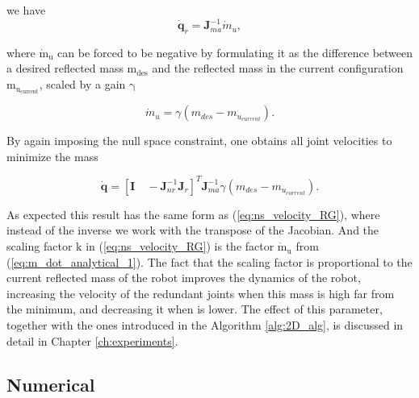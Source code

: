 we have 
\begin{equation}
\mathbf{\dot{q}}_r = \mathbf{J}_{ma}^{-1} {\dot{m}_u},
\label{eq:qr_jma}
\end{equation}

where ${\mathrm{\dot{m}_u}}$ can be forced  to be negative by formulating it as the difference between a desired reflected mass $\mathrm{m_{des}}$ and the reflected mass in the current configuration $\mathrm{m_{u_{current}}}$, scaled by a gain $\mathrm{\gamma}$


\begin{equation}
{\dot{m}_u} =  \gamma (m_{des} - m_{u_{current}}).
\label{eq:m_dot_analytical_1}
\end{equation}

By again imposing the null space constraint, one obtains all joint velocities to minimize the mass

\begin{equation}
\mathbf{\dot{q}} = [\mathbf{I} \quad  -\mathbf{J}_{nr}^{-1} \mathbf{J}_r]^T   \mathbf{J}_{ma}^{-1} \gamma (m_{des} - m_{u_{current}})  .
\label{eq:qdot_analytical}
\end{equation}

As expected this result has the same form as (\ref{eq:ns_velocity_RG}), where instead of the inverse we work with the transpose of the Jacobian. And the scaling factor $\mathrm{k}$ in (\ref{eq:ns_velocity_RG}) is the factor $\mathrm{\dot{m}_u}$ from (\ref{eq:m_dot_analytical_1}). The fact that the scaling factor is proportional to the current reflected mass of the robot improves the dynamics of the robot, increasing the velocity of the redundant joints when this mass is high far from the minimum, and decreasing it when is lower. 
The effect of this parameter, together with the ones introduced in the Algorithm \ref{alg:2D_alg}, is discussed in detail in Chapter \ref{ch:experiments}.



\subsection{Numerical}
\label{sec:numerical}


